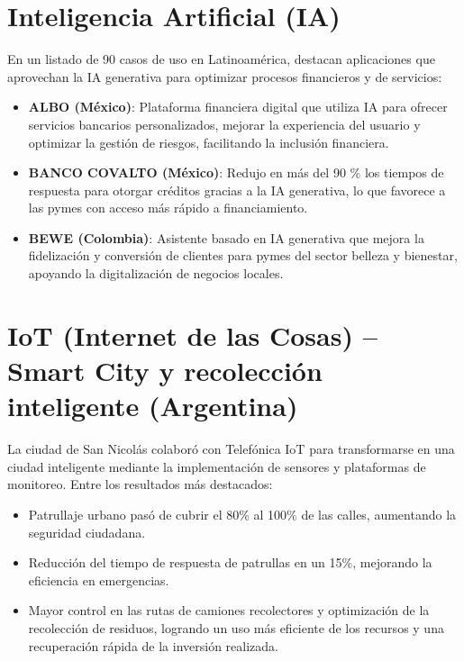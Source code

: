\documentclass[12pt]{article}
\begin{document}
\section*{Inteligencia Artificial (IA)}
\noindent En un listado de 90 casos de uso en Latinoamérica, destacan aplicaciones que aprovechan la IA generativa para optimizar procesos financieros y de servicios:
\begin{itemize}
    \item \textbf{ALBO (México)}: Plataforma financiera digital que utiliza IA para ofrecer servicios bancarios personalizados, mejorar la experiencia del usuario y optimizar la gestión de riesgos, facilitando la inclusión financiera.
    \item \textbf{BANCO COVALTO (México)}: Redujo en más del 90 \% los tiempos de respuesta para otorgar créditos gracias a la IA generativa, lo que favorece a las pymes con acceso más rápido a financiamiento.
    \item \textbf{BEWE (Colombia)}: Asistente basado en IA generativa que mejora la fidelización y conversión de clientes para pymes del sector belleza y bienestar, apoyando la digitalización de negocios locales.
\end{itemize}

\newpage
\section*{IoT (Internet de las Cosas) – Smart City y recolección inteligente (Argentina)}
\noindent La ciudad de San Nicolás colaboró con Telefónica IoT para transformarse en una ciudad inteligente mediante la implementación de sensores y plataformas de monitoreo. Entre los resultados más destacados:
\begin{itemize}
    \item Patrullaje urbano pasó de cubrir el 80\% al 100\% de las calles, aumentando la seguridad ciudadana.
    \item Reducción del tiempo de respuesta de patrullas en un 15\%, mejorando la eficiencia en emergencias.
    \item Mayor control en las rutas de camiones recolectores y optimización de la recolección de residuos, logrando un uso más eficiente de los recursos y una recuperación rápida de la inversión realizada.
\end{itemize}
\end{document}
